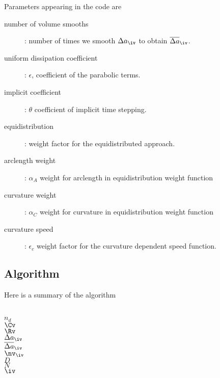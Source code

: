 Parameters appearing in the code are
\begin{description}
  \item[number of volume smooths] : number of times we smooth $\da_\iv$ to obtain $\das_\iv$.
  \item[uniform dissipation coefficient] : $\epsilon$, coefficient of the parabolic terms.
  \item[implicit coefficient] : $\theta$ coefficient of implicit time stepping.
  \item[equidistribution] : weight factor for the equidistributed approach.
  \item[arclength weight] : $\alpha_A$ weight for arclength in equidistribution weight function
  \item[curvature weight] : $\alpha_C$ weight for curvature in equidistribution weight function
  \item[curvature speed] : $\epsilon_c$ weight factor for the curvature dependent speed function.
\end{description}

\clearpage
\subsection{Algorithm}

Here is a summary of the algorithm 

\begin{flushleft}
\\
 $n_d$ \\
  $\Cv$ \\
  $\Rv$ \\
  $\da_\iv$ \\
  $\das_\iv$ \\
  $\nv_\iv$ \\
  $D$ \\
  $N$ \\
  $\iv$ 
\end{flushleft}


